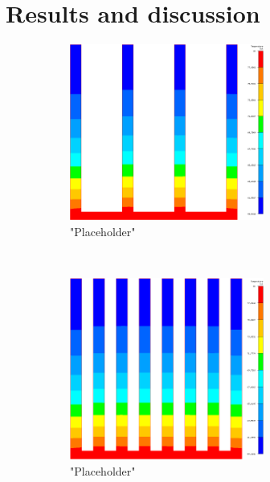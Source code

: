 \section{Results and discussion}
 
 \begin{figure}[h]
 \begin{subfigure}[t] {0.23\textwidth}
 \centering
 \includegraphics[width=0.7\textwidth]{../figures/heatsink4_h105_gmf005.png}
 \caption{"Placeholder"}
 \label{fig:res_4_1}
 \end{subfigure}
 ~
  \begin{subfigure}[t] {0.23\textwidth}
 \centering
 \includegraphics[width=0.7\textwidth]{../figures/heatsink8_h105_gmf005.png}
 \caption{"Placeholder"}
 \label{fig:res_8_1}
 \end{subfigure}
 ~
 \begin{subfigure}[t] {0.23\textwidth}
 \centering

\end{subfigure}
\end{figure}
